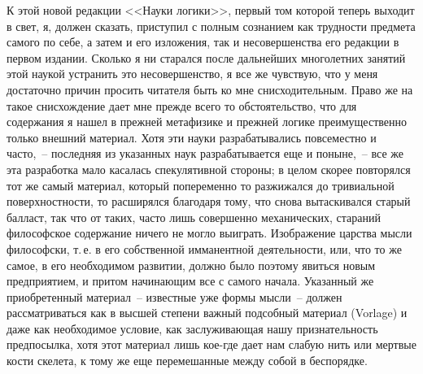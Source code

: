 К этой новой редакции <<Науки логики>>, первый том
которой теперь выходит в свет, я, должен сказать, приступил
с полным сознанием как трудности предмета
самого по себе, а затем и его изложения, так и несовершенства
его редакции в первом издании. Сколько я ни старался
после дальнейших многолетних занятий этой наукой
устранить это несовершенство, я все же чувствую,
что у меня достаточно причин просить читателя быть ко
мне снисходительным. Право же на такое снисхождение
дает мне прежде всего то обстоятельство, что для содержания
я нашел в прежней метафизике и прежней логике
преимущественно только внешний материал. Хотя эти
науки разрабатывались повсеместно и часто,~-- последняя
из указанных наук разрабатывается еще и поныне,~-- все
же эта разработка мало касалась спекулятивной стороны;
в целом скорее повторялся тот же самый материал, который
попеременно то разжижался до тривиальной поверхностности,
то расширялся благодаря тому, что снова вытаскивался
старый балласт, так что от таких, часто лишь
совершенно механических, стараний философское содержание
ничего не могло выиграть. Изображение царства
мысли философски, т.\,е. в его собственной имманентной
деятельности, или, что то же самое, в его необходимом
развитии, должно было поэтому явиться новым предприятием,
и притом начинающим все с самого начала. Указанный
же приобретенный материал~-- известные уже
формы мысли~-- должен рассматриваться как в высшей
степени важный подсобный материал (Vorlage) и даже
как необходимое условие, как заслуживающая нашу признательность
предпосылка, хотя этот материал лишь кое-где
дает нам слабую нить или мертвые кости скелета, к
тому же еще перемешанные между собой в беспорядке.

